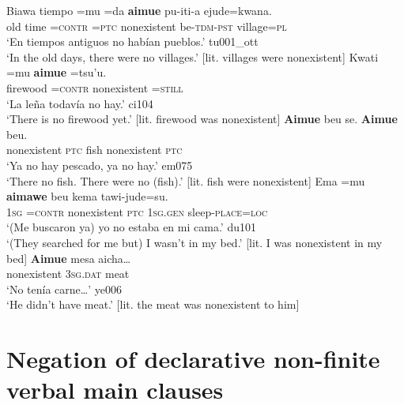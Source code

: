\documentclass[output=paper]{langsci/langscibook}
\begin{document}
\begin{exe}\ex\label{ex:tacana-villages-firewood}\begin{xlist}
\ex\label{ex:tacana-villages}
\gll {\ob}Biawa tiempo{\cb} =mu =da \textbf{aimue}
pu-iti-a ejude=kwana.\\
    old  time  =\textsc{contr}  \textsc{=ptc}  nonexistent
    be-\textsc{tdm-pst}  village=\textsc{pl}\\
\glt `En tiempos antiguos no habían pueblos.' tu001\_ott\\
`In the old days, there were no villages.' [lit. villages were nonexistent]
\ex\label{ex:tacana-firewood}
\gll {}Kwati  =mu \textbf{aimue}  =tsu'u.\\
    firewood  =\textsc{contr}  nonexistent  =\textsc{still}\\
\glt `La leña todavía no hay.' ci104\\
`There is no firewood yet.' [lit. firewood was nonexistent]
\ex\label{ex:tacana-nofish}
\gll {}\textbf{Aimue}  beu se. \textbf{Aimue}  beu.\\
    nonexistent  \textsc{ptc}  fish  nonexistent  \textsc{ptc}\\
\glt `Ya no hay pescado, ya no hay.' em075\\
`There no fish. There were no (fish).' [lit. fish were nonexistent]
\ex\label{ex:tacana-mybed}
\gll {}Ema  =mu \textbf{aimawe}  beu
 kema tawi-jude=su{\cb}.\\
    \textsc{1sg}  \textsc{=contr}  nonexistent  \textsc{ptc}
    \textsc{1sg.gen}  sleep-\textsc{place=loc}\\
\glt `(Me buscaron ya) yo no estaba en mi cama.' du101\\
`(They searched for me but) I wasn't in my bed.' [lit. I was nonexistent in my bed]
\ex\label{ex:tacana-no-meat}
\gll {}\textbf{Aimue} mesa aicha…\\
    nonexistent  \textsc{3sg.dat}  meat\\
\glt `No tenía carne…' ye006\\
`He didn't have meat.' [lit. the meat was nonexistent to him]
\end{xlist}\end{exe}

\section{Negation of declarative non-finite verbal main clauses}\label{sec:tacana-6}
\end{document}
